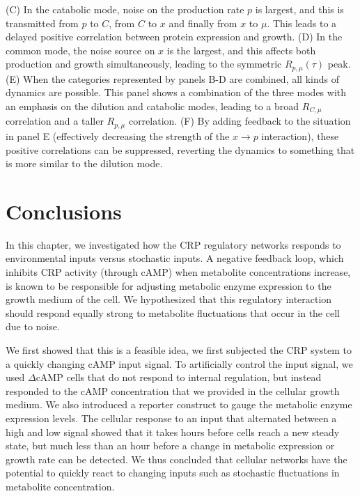 {	(C) In the catabolic mode, noise on the production rate $p$ is largest, and this is transmitted from $p$ to $C$, from $C$ to $x$ and finally from $x$ to $\mu$. This leads to a delayed positive correlation between protein expression and growth.
	(D) In the common mode, the noise source on $x$ is the largest, and this affects both production and growth simultaneously, leading to the symmetric $R_{p,\mu}(\tau)$ peak. 
	(E) When the categories represented by panels B-D are combined, all kinds of dynamics are possible. This panel shows a combination of the three modes with an emphasis on the dilution and catabolic modes, leading to a broad $R_{C,\mu}$ correlation and a taller $R_{p,\mu}$ correlation.
	(F) By adding feedback to the situation in panel E (effectively decreasing the strength of the ${x}\rightarrow{p}$ interaction), these positive correlations can be suppressed, reverting the dynamics to something that is more similar to the dilution mode.
    \label{fig:CRP:fig4}
}










\section{Conclusions}

In this chapter, 
we investigated how the CRP regulatory networks responds to environmental inputs versus stochastic inputs.
%
A negative feedback loop, which inhibits CRP activity (through cAMP) 
when metabolite concentrations increase,
is known to be responsible for adjusting metabolic enzyme expression to the growth medium of the cell.
%
We hypothesized that this regulatory interaction should respond equally strong to metabolite fluctuations that occur in the cell due to noise. 

We first showed that 
this is a feasible idea, we first subjected the CRP system to a quickly changing cAMP input signal.
To artificially control the input signal, we used $\Delta$cAMP cells that do not respond to internal regulation, but instead responded to the cAMP concentration that we provided in the cellular growth medium.
We also introduced a reporter construct to gauge the metabolic enzyme expression levels.
%
The cellular response to an input that alternated between a high and low signal showed that 
it takes hours before cells reach a new steady state, but much less than an hour before a change in metabolic expression or growth rate can be detected.
%
We thus concluded that cellular networks have the potential to quickly react to changing inputs such as stochastic fluctuations in metabolite concentration.

